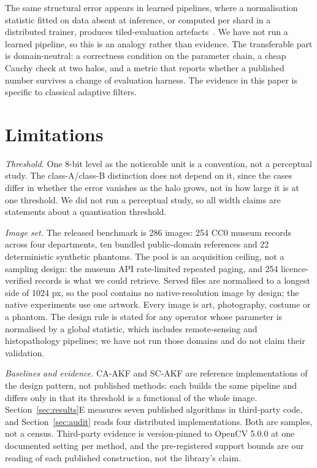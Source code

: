 \documentclass[journal]{IEEEtran}
\begin{document}
The same structural error appears in learned pipelines, where a normalisation statistic fitted on data absent at inference, or computed per shard in a distributed trainer, produces tiled-evaluation artefacts~\cite{buglakova2025tiling}. We have not run a learned pipeline, so this is an analogy rather than evidence. The transferable part is domain-neutral: a correctness condition on the parameter chain, a cheap Cauchy check at two halos, and a metric that reports whether a published number survives a change of evaluation harness. The evidence in this paper is specific to classical adaptive filters.

\section{Limitations}\label{sec:limits}

\emph{Threshold.} One 8-bit level as the noticeable unit is a convention, not a perceptual study. The class-A/class-B distinction does not depend on it, since the cases differ in whether the error vanishes as the halo grows, not in how large it is at one threshold. We did not run a perceptual study, so all width claims are statements about a quantisation threshold.

\emph{Image set.} The released benchmark is 286 images: 254 CC0 museum records across four departments, ten bundled public-domain references and 22 deterministic synthetic phantoms. The pool is an acquisition ceiling, not a sampling design: the museum API rate-limited repeated paging, and 254 licence-verified records is what we could retrieve. Served files are normalised to a longest side of 1024 px, so the pool contains no native-resolution image by design; the native experiments use one artwork. Every image is art, photography, costume or a phantom. The design rule is stated for any operator whose parameter is normalised by a global statistic, which includes remote-sensing and histopathology pipelines; we have not run those domains and do not claim their validation.

\emph{Baselines and evidence.} CA-AKF and SC-AKF are reference implementations of the design pattern, not published methods: each builds the same pipeline and differs only in that its threshold is a functional of the whole image. Section~\ref{sec:results}E measures seven published algorithms in third-party code, and Section~\ref{sec:audit} reads four distributed implementations. Both are samples, not a census. Third-party evidence is version-pinned to OpenCV 5.0.0 at one documented setting per method, and the pre-registered support bounds are our reading of each published construction, not the library's claim.
\end{document}
